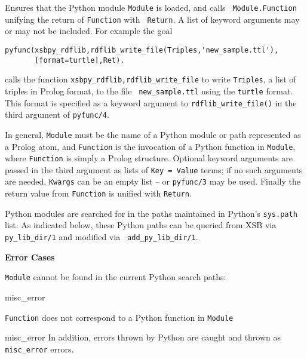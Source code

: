 \begin{description}

%
 Ensures that the Python module {\tt Module} is loaded, and calls {\tt
   Module.Function} unifying the return of {\tt Function} with {\tt
   Return}.  A list of keyword arguments may or may not be included.
 For example the goal

\begin{verbatim}
pyfunc(xsbpy_rdflib,rdflib_write_file(Triples,'new_sample.ttl'),
       [format=turtle],Ret).
\end{verbatim}

calls the function {\tt xsbpy\_rdflib,rdflib\_write\_file} to write
{\tt Triples}, a list of triples in Prolog format, to the file {\tt
  new\_sample.ttl} using the {\tt turtle} format.  This format is
specified as a keyword argument to {\tt rdflib\_write\_file()} in the
third argument of {\tt pyfunc/4}.

In general, {\tt Module} must be the name of a Python module or path
represented as a Prolog atom, and {\tt Function} is the invocation of
a Python function in {\tt Module}, where {\tt Function} is simply a
Prolog structure.  Optional keyword arguments are passed in the third
argument as lists of {\tt Key = Value} terms; if no such arguments are
needed, {\tt Kwargs} can be an empty list -- or {\tt pyfunc/3} may be
used.  Finally the return value from {\tt Function} is unified with
{\tt Return}.

Python modules are searched for in the paths maintained in Python's
{\tt sys.path} list.  As indicated below, these Python paths can be
queried from XSB via {\tt py\_lib\_dir/1} and modified via {\tt
  add\_py\_lib\_dir/1}.
     
{\bf Error Cases}
\bi
\item {\tt Module} cannot be found in the current Python search paths:
\bi
\item misc\_error
\ei
\item {\tt Function} does not correspond to a Python function in {\tt Module}
\bi
\item misc\_error
  \ei \ei
  In addition, errors thrown by Python are
  caught and thrown as {\tt misc\_error} errors.


\end{description}
